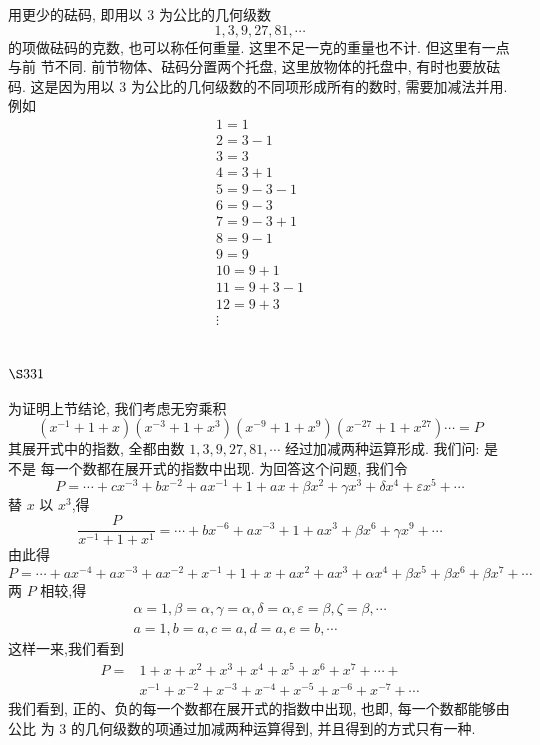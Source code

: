 用更少的砝码, 即用以 3 为公比的几何级数
\[
1,3,9,27,81, \cdots
\]
的项做砝码的克数, 也可以称任何重量. 这里不足一克的重量也不计. 但这里有一点与前 节不同. 前节物体、砝码分置两个托盘, 这里放物体的托盘中, 有时也要放砝码. 这是因为用以 3 为公比的几何级数的不同项形成所有的数时, 需要加减法并用. 例如
\[
\begin{gathered}
1=1 \\
2=3-1 \\
3=3 \\
4=3+1 \\
5=9-3-1 \\
6=9-3 \\
7=9-3+1 \\
8=9-1 \\
9=9 \\
10=9+1 \\
11=9+3-1 \\
12=9+3 \\
\vdots 
\end{gathered}
\]
\section{$\S 331$}

为证明上节结论, 我们考虑无穷乘积
\[
\left(x^{-1}+1+x\right)\left(x^{-3}+1+x^{3}\right)\left(x^{-9}+1+x^{9}\right)\left(x^{-27}+1+x^{27}\right) \cdots=P
\]
其展开式中的指数, 全都由数 $1,3,9,27,81, \cdots$ 经过加减两种运算形成. 我们问: 是不是 每一个数都在展开式的指数中出现. 为回答这个问题, 我们令
\[
P=\cdots+c x^{-3}+b x^{-2}+a x^{-1}+1+a x+\beta x^{2}+\gamma x^{3}+\delta x^{4}+\varepsilon x^{5}+\cdots
\]
替 $x$ 以 $x^{3}$,得
\[
\frac{P}{x^{-1}+1+x^{1}}=\cdots+b x^{-6}+a x^{-3}+1+a x^{3}+\beta x^{6}+\gamma x^{9}+\cdots
\]
由此得
\[
P=\cdots+a x^{-4}+a x^{-3}+a x^{-2}+x^{-1}+1+x+a x^{2}+a x^{3}+\alpha x^{4}+\beta x^{5}+\beta x^{6}+\beta x^{7}+\cdots
\]
两 $P$ 相较,得
\[
\begin{gathered}
\alpha=1, \beta=\alpha, \gamma=\alpha, \delta=\alpha, \varepsilon=\beta, \zeta=\beta, \cdots \\
a=1, b=a, c=a, d=a, e=b, \cdots
\end{gathered}
\]
这样一来,我们看到
\[
\begin{aligned}
P= & 1+x+x^{2}+x^{3}+x^{4}+x^{5}+x^{6}+x^{7}+\cdots+ \\
& x^{-1}+x^{-2}+x^{-3}+x^{-4}+x^{-5}+x^{-6}+x^{-7}+\cdots
\end{aligned}
\]
我们看到, 正的、负的每一个数都在展开式的指数中出现, 也即, 每一个数都能够由公比 为 3 的几何级数的项通过加减两种运算得到, 并且得到的方式只有一种. 

